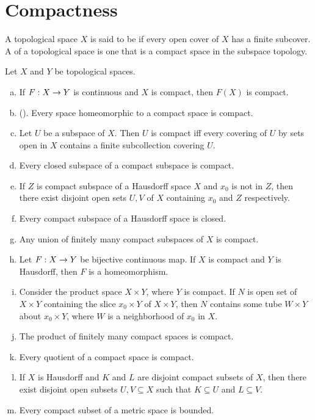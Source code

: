 \documentclass[11pt,a4paper]{article}
\begin{document}
\section{Compactness}

\begin{mydef}
A topological space $X$ is said to be  if every open cover of $X$ has a finite subcover. A  of a topological space is one that is a compact space in the subspace topology.
\end{mydef}

\begin{prop} \label{prop:compact_spaces}
Let $X$ and $Y$ be topological spaces.
\begin{enumerate}[(a)]
    \item If $F:X\rightarrow Y$ is continuous and $X$ is compact, then $F(X)$ is compact.
    \item (). Every space homeomorphic to a compact space is compact.
    \item Let $U$ be a subspace of $X$. Then $U$ is compact iff every covering of $U$ by sets open in $X$ contains a finite subcollection covering $U$.
    \item Every closed subspace of a compact subspace is compact.
    \item If $Z$ is compact subspace of a Hausdorff space $X$ and $x_0$ is not in $Z$, then there exist disjoint open sets $U,V$ of $X$ containing $x_0$ and $Z$ respectively.
    \item Every compact subspace of a Hausdorff space is closed.
    \item Any union of finitely many compact subspaces of $X$ is compact.
    \item Let $F:X\rightarrow Y$ be bijective continuous map. If $X$ is compact and $Y$ is Hausdorff, then $F$ is a homeomorphism.
    \item {} Consider the product space $X\times Y$, where $Y$ is compact. If $N$ is open set of $X\times Y$ containing the slice $x_0\times Y$ of $X\times Y$, then $N$ contains some tube $W\times Y$ about $x_0\times Y$, where $W$ is a neighborhood of $x_0$ in $X$.
    \item The product of finitely many compact spaces is compact.
    \item Every quotient of a compact space is compact.
    \item If $X$ is Hausdorff and $K$ and $L$ are disjoint compact subsets of $X$, then there exist disjoint open subsets $U,V\subseteq X$ such that $K\subseteq U$ and $L\subseteq V$.
    \item Every compact subset of a metric space is bounded.
\end{enumerate}
\end{prop}
\end{document}
